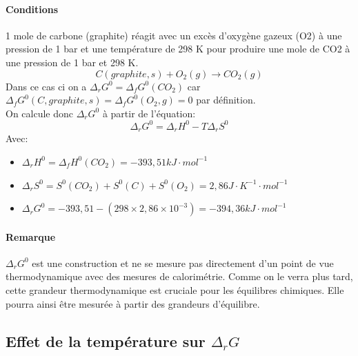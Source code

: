 \documentclass[10pt,a4paper]{book}
\begin{document}
\paragraph{Conditions} 1 mole de carbone (graphite) réagit avec un excès d'oxygène gazeux (O2) à une pression de 1 bar et une température de 298 K pour produire une mole de CO2 à une pression de 1 bar et 298 K. 
\[C(graphite, s) + O_2(g) \rightarrow CO_2(g)\]
Dans ce cas ci on a \(\Delta_rG^0 = \Delta_fG^0(CO_2)\) car \(\Delta_fG^0(C, graphite, s) = \Delta_fG^0(O_2, g) = 0\) par définition. \\
On calcule donc \(\Delta_rG^0\) à partir de l'équation:
\[\Delta_rG^0 = \Delta_rH^0 - T\Delta_rS^0\]
Avec: 
\begin{itemize}
\item \(\Delta_rH^0 = \Delta_fH^0(CO_2) = -393,51 kJ\cdot mol^{-1}\) 
\item \(\Delta_rS^0 = S^0(CO_2) + S^0(C) + S^0(O_2) = 2,86 J\cdot K^{-1} \cdot mol^{-1}\) 
\item \(\Delta_rG^0 = -393,51 - (298 \times 2,86 \times 10^{-3}) = -394,36 kJ\cdot mol^{-1} \)
\end{itemize}
\paragraph{Remarque} \(\Delta_rG^0\) est une construction et ne se mesure pas directement d'un point de vue thermodynamique avec des mesures de calorimétrie. Comme on le verra plus tard, cette grandeur thermodynamique est cruciale pour les équilibres chimiques. Elle pourra ainsi être mesurée à partir des grandeurs d'équilibre.

\subsection{Effet de la température sur \texorpdfstring{$\Delta_rG$}{Delta G}}
\end{document}
